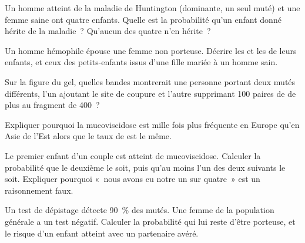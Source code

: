\begin{exercise}[$\star\star$]\label{exo:g11:genes-and-disease:8}
Un homme atteint de la maladie de Huntington (dominante, un seul 
muté) et une femme saine ont quatre enfants. Quelle est la probabilité
qu'un enfant donné hérite de la maladie~? Qu'aucun des quatre n'en
hérite~?
\end{exercise}

\begin{exercise}[$\star\star$]\label{exo:g11:genes-and-disease:9}
Un homme hémophile épouse une femme non porteuse. Décrire les 
et les  de leurs enfants, et ceux des petits-enfants issus
d'une fille mariée à un homme sain.
\end{exercise}

\begin{exercise}[$\star\star$]\label{exo:g11:genes-and-disease:10}
Sur la figure du gel, quelles bandes montrerait une personne portant
deux  mutés différents, l'un ajoutant le site de coupure et
l'autre supprimant 100 paires de  de plus au fragment de 400~?
\end{exercise}

\begin{exercise}[$\star\star$]\label{exo:g11:genes-and-disease:11}
Expliquer pourquoi la mucoviscidose est mille fois plus fréquente en
Europe qu'en Asie de l'Est alors que le taux de  est le même.
\end{exercise}

\begin{exercise}[$\star\star\star$]\label{exo:g11:genes-and-disease:12}
Le premier enfant d'un couple est atteint de mucoviscidose. Calculer la
probabilité que le deuxième le soit, puis qu'au moins l'un des deux
suivants le soit. Expliquer pourquoi «~nous avons eu notre un sur
quatre~» est un raisonnement faux.
\end{exercise}

\begin{exercise}[$\star\star\star$]\label{exo:g11:genes-and-disease:13}
Un test de dépistage détecte 90~\% des  mutés. Une femme de la
population générale a un test négatif. Calculer la probabilité qui lui
reste d'être porteuse, et le risque d'un enfant atteint avec un
partenaire  avéré.
\end{exercise}

